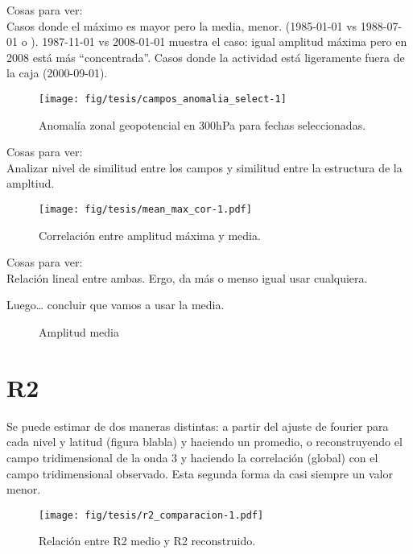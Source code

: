 \documentclass[spanish,a4paper]{book}
\begin{document}
Cosas para ver:\\
Casos donde el máximo es mayor pero la media, menor. (1985-01-01 vs
1988-07-01 o ). 1987-11-01 vs 2008-01-01 muestra el caso: igual amplitud
máxima pero en 2008 está más ``concentrada''. Casos donde la actividad
está ligeramente fuera de la caja (2000-09-01).

\begin{figure*}
\texttt{[image: fig/tesis/campos\_anomalia\_select-1]} \caption{Anomalía zonal geopotencial en 300hPa para fechas seleccionadas.}\label{fig:campos_anomalia_select}
\end{figure*}

Cosas para ver:\\
Analizar nivel de similitud entre los campos y similitud entre la
estructura de la ampltiud.

\begin{figure}
\centering
\texttt{[image: fig/tesis/mean\_max\_cor-1.pdf]}
\caption{Correlación entre amplitud máxima y media.}
\end{figure}

Cosas para ver:\\
Relación lineal entre ambas. Ergo, da más o menso igual usar cualquiera.

Luego\ldots{} concluir que vamos a usar la media.

\begin{figure*}
\newline{}\caption{Amplitud media}\label{fig:amplitud_timeseries}
\end{figure*}

\section{R2}\label{r2}

Se puede estimar de dos maneras distintas: a partir del ajuste de
fourier para cada nivel y latitud (figura blabla) y haciendo un
promedio, o reconstruyendo el campo tridimensional de la onda 3 y
haciendo la correlación (global) con el campo tridimensional observado.
Esta segunda forma da casi siempre un valor menor.

\begin{figure}
\centering
\texttt{[image: fig/tesis/r2\_comparacion-1.pdf]}
\caption{Relación entre R2 medio y R2 reconstruido.}
\end{figure}
\end{document}
